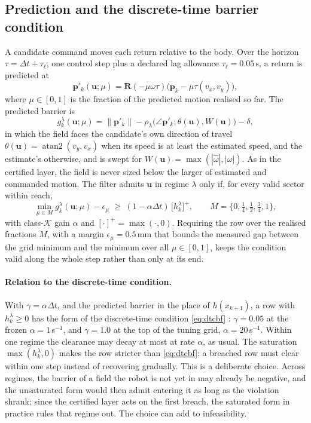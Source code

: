 \documentclass[11pt]{article}
\theoremstyle{definition}
\begin{document}
\subsection{Prediction and the discrete-time barrier condition}
A candidate command moves each return relative to the body. Over the horizon $\tau=\Delta t+\tau_\ell$,
one control step plus a declared lag allowance $\tau_\ell=0.05$\,s, a return is predicted at
\begin{equation}
\mathbf{p}'_k(\mathbf{u};\mu)=\mathbf{R}(-\mu\omega\tau)\big(\mathbf{p}_k-\mu\tau(v_x,v_y)\big),
\label{eq:prediction}
\end{equation}
where $\mu\in[0,1]$ is the fraction of the predicted motion realised so far. The predicted barrier is
\begin{equation}
g^\lambda_k(\mathbf{u};\mu)=\|\mathbf{p}'_k\|-\rho_\lambda\big(\angle\mathbf{p}'_k;\theta(\mathbf{u}),W(\mathbf{u})\big)-\delta,
\label{eq:predicted}
\end{equation}
in which the field faces the candidate's own direction of travel $\theta(\mathbf{u})=
\operatorname{atan2}(v_y,v_x)$ when its speed is at least the estimated speed, and the estimate's
otherwise, and is swept for $W(\mathbf{u})=\max(|\hat\omega|,|\omega|)$. As in the certified layer, the
field is never sized below the larger of estimated and commanded motion. The filter admits $\mathbf{u}$
in regime $\lambda$ only if, for every valid sector within reach,
\begin{equation}
\min_{\mu\in M}g^\lambda_k(\mathbf{u};\mu)-\epsilon_\mu\;\ge\;(1-\alpha\Delta t)\,\big[h^\lambda_k\big]^+,
\qquad M=\{0,\tfrac14,\tfrac12,\tfrac34,1\},
\label{eq:cbf}
\end{equation}
with class-$\mathcal{K}$ gain $\alpha$ and $[\cdot]^+=\max(\cdot,0)$. Requiring the row over the realised
fractions $M$, with a margin $\epsilon_\mu=0.5$\,mm that bounds the measured gap between the grid minimum
and the minimum over all $\mu\in[0,1]$, keeps the condition valid along the whole step rather than only at
its end. 
\paragraph{Relation to the discrete-time condition.} With $\gamma=\alpha\Delta t$, and the predicted barrier in the place
of $h(x_{k+1})$, a row with $h^\lambda_k\ge0$ has the form of the discrete-time condition \eqref{eq:dtcbf}
\citep{agrawal2017discrete,garg2024advances}: $\gamma=0.05$ at the frozen $\alpha=1$\,s$^{-1}$, and $\gamma=1.0$ at the top
of the tuning grid, $\alpha=20$\,s$^{-1}$. Within one regime the clearance may decay at most at rate $\alpha$, as usual. The
saturation $\max(h^\lambda_k,0)$ makes the row stricter than \eqref{eq:dtcbf}: a breached row must clear within one step
instead of recovering gradually. This is a deliberate choice. Across regimes, the barrier of a field the robot is not yet
in may already be negative, and the unsaturated form would then admit entering it as long as the violation shrank; since
the certified layer acts on the first breach, the saturated form in practice rules that regime out. The choice can add
to infeasibility.
\end{document}

